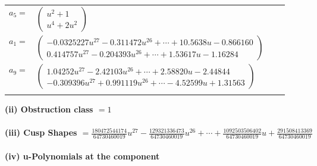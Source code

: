 \documentclass[1p]{elsarticle_modified}
\theoremstyle{definition}
\begin{document}
\begin{tabular}{m{7pt} m{180pt} m{7pt} m{180pt} }
\flushright $a_{5}=$&$\begin{pmatrix}u^2+1\\u^4+2 u^2\end{pmatrix}$ \\
\flushright $a_{1}=$&$\begin{pmatrix}-0.0325227 u^{27}-0.311472 u^{26}+\cdots+10.5638 u-0.866160\\0.414757 u^{27}-0.204393 u^{26}+\cdots+1.53617 u-1.16284\end{pmatrix}$ \\
\flushright $a_{9}=$&$\begin{pmatrix}1.04252 u^{27}-2.42103 u^{26}+\cdots+2.58820 u-2.44844\\-0.309396 u^{27}+0.991119 u^{26}+\cdots-4.52599 u+1.31563\end{pmatrix}$\\&\end{tabular}
\flushleft \textbf{(ii) Obstruction class $= 1$}\\~\\
\flushleft \textbf{(iii) Cusp Shapes $= \frac{180472544174}{64730460019} u^{27}-\frac{129321336473}{64730460019} u^{26}+\cdots+\frac{1092503506402}{64730460019} u+\frac{291508413369}{64730460019}$}\\~\\
\newpage\renewcommand{\arraystretch}{1}
\flushleft \textbf{(iv) u-Polynomials at the component}\newline \\
\end{document}
